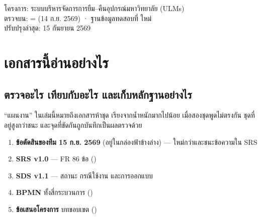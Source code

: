 \begin{titlepage}
\vfill
{}
\vspace{0.3em}

{\sansall\footnotesize\color{muted}
โครงการ: ระบบบริหารจัดการการยืม--คืนอุปกรณ์มหาวิทยาลัย (ULMs)\\
ตรวจบน:  =  (14 ก.ย. 2569) · ฐานข้อมูลทดสอบที่  ใหม่\\
ปรับปรุงล่าสุด: 15 กันยายน 2569}
\end{titlepage}

{\hypersetup{allcolors=ink}\tableofcontents}
\clearpage

\section*{เอกสารนี้อ่านอย่างไร}

\subsection*{ตรวจอะไร เทียบกับอะไร และเก็บหลักฐานอย่างไร}

``แผนงาน'' ในเล่มนี้หมายถึงเอกสารห้าชุด เรียงจากน้ำหนักมากไปน้อย เมื่อสองชุดพูดไม่ตรงกัน
ชุดที่อยู่สูงกว่าชนะ และจุดที่ขัดกันถูกบันทึกเป็นผลตรวจด้วย

\begin{enumerate}
\item \textbf{ข้อตัดสินของทีม 15 ก.ย. 2569} (อยู่ในกล่องฟ้าข้างล่าง) --- ใหม่กว่าและชนะข้อความใน SRS
\item \textbf{SRS v1.0} --- FR 86 ข้อ ()
\item \textbf{SDS v1.1} --- สถานะ กรณีใช้งาน และการออกแบบ 
\item \textbf{BPMN} ทั้งสี่กระบวนการ ()
\item \textbf{ข้อเสนอโครงการ} บทขอบเขต ()
\end{enumerate}

